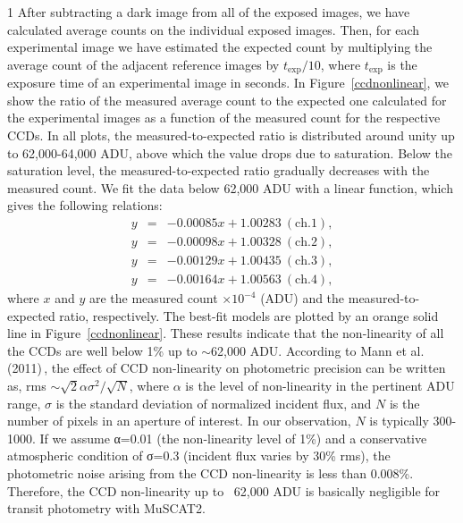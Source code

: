 \documentclass[a4paper,12pt]{spieman}  %
\begin{document}
\begin{spacing}{1}
After subtracting a dark image from all of the exposed images,
we have calculated average counts on the individual exposed images.
Then, for each experimental image we have estimated the expected count
by multiplying the average count of the adjacent reference images by $t_\mathrm{exp}/10$,
where $t_\mathrm{exp}$ is the exposure time of an experimental image in seconds.
In Figure~\ref{ccdnonlinear}, we show the ratio of the measured average count to
the expected one calculated for the experimental images as a function of
the measured count for the respective CCDs.
In all plots, the measured-to-expected ratio is distributed around unity up to 62,000-64,000 ADU,
above which the value drops due to saturation.
Below the saturation level, the measured-to-expected ratio gradually decreases with the measured count.
We fit the data below 62,000 ADU with a linear function, which gives the following relations:
\begin{eqnarray}
y &=& -0.00085  x + 1.00283\ \mathrm{(ch.1)},\\
y &=& -0.00098  x + 1.00328\ \mathrm{(ch.2)},\\
y &=& -0.00129  x + 1.00435\ \mathrm{(ch.3)},\\
y &=& -0.00164  x +  1.00563\ \mathrm{(ch.4)},
\end{eqnarray}
where $x$ and $y$ are the measured count $\times10^{-4}$ (ADU) and
the measured-to-expected ratio, respectively.
The best-fit models are plotted by an orange solid line in Figure~\ref{ccdnonlinear}.
These results indicate that the non-linearity of all the CCDs are
well below 1\% up to $\sim$62,000 ADU.
According to Mann et al. (2011)\cite{2011PASP..123.1273M}\,\!,
the effect of CCD non-linearity on photometric precision can be written as,
rms $\sim\sqrt{2} \alpha \sigma^2 / \sqrt{N}$,
where $\alpha$ is the level of non-linearity in the pertinent ADU range, $\sigma$ is
the standard deviation of normalized incident flux, and $N$ is the number of pixels in an aperture of interest.
In our observation, $N$ is typically 300-1000.
If we assume α=0.01 (the non-linearity level of 1\%) and a conservative atmospheric condition of σ=0.3
(incident flux varies by 30\% rms), the photometric noise arising from the CCD non-linearity is less than 0.008\%.
Therefore, the CCD non-linearity up to ~62,000 ADU is basically negligible for transit photometry with MuSCAT2.


\end{spacing}
\end{document}
